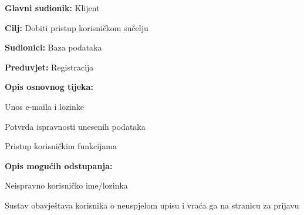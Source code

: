 					\noindent {}
					\begin{packed_item}
	
						\item \textbf{Glavni sudionik: } Klijent
						\item  \textbf{Cilj:} Dobiti pristup korisničkom sučelju
						\item  \textbf{Sudionici:} Baza podataka
						\item  \textbf{Preduvjet:} Registracija
						\item  \textbf{Opis osnovnog tijeka:}
						
						\item[] \begin{packed_enum}
	
							\item Unos e-maila i lozinke
							\item Potvrda ispravnosti unesenih podataka
							\item Pristup korisničkim funkcijama

						\end{packed_enum}
						
						\item  \textbf{Opis mogućih odstupanja:}
						
						\item[] \begin{packed_item}
	
							\item[2.a] Neispravno korisničko ime/lozinka
							\item[] \begin{packed_enum}
								
								\item Sustav obavještava korisnika o neuspjelom upisu i vraća ga na stranicu za prijavu
								
							\end{packed_enum}

						\end{packed_item}
					\end{packed_item}
					
